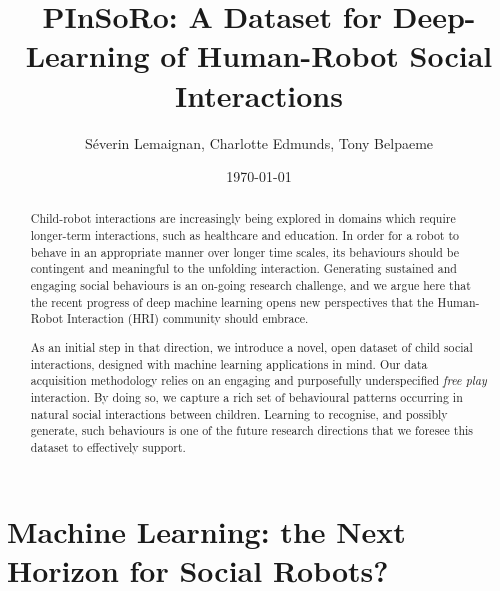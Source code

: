\documentclass{article}
\title{PInSoRo: A Dataset for Deep-Learning of Human-Robot Social Interactions}
\author{Séverin Lemaignan, Charlotte Edmunds, Tony Belpaeme}
\date{\today}
\begin{document}
\maketitle

\begin{abstract}


Child-robot interactions are increasingly being explored in domains which
require longer-term interactions, such as healthcare and education. In order
for a robot to behave in an appropriate manner over longer time scales, its
behaviours should be contingent and meaningful to the unfolding interaction.
Generating sustained and engaging social behaviours is an on-going research
challenge, and we argue here that the recent progress of deep machine learning
opens new perspectives that the Human-Robot Interaction (HRI) community
should embrace.

As an initial step in that direction, we introduce a novel,
open dataset of child social interactions, designed with
machine learning applications in mind. Our data acquisition methodology relies on
an engaging and purposefully underspecified \emph{free play} interaction. By doing
so, we capture a rich set of behavioural patterns occurring in natural
social interactions between children. Learning to recognise, and possibly generate, such
behaviours is one of the future research directions that we foresee this dataset to effectively support.


\end{abstract}

\section{Machine Learning: the Next Horizon for Social Robots?}
\end{document}
